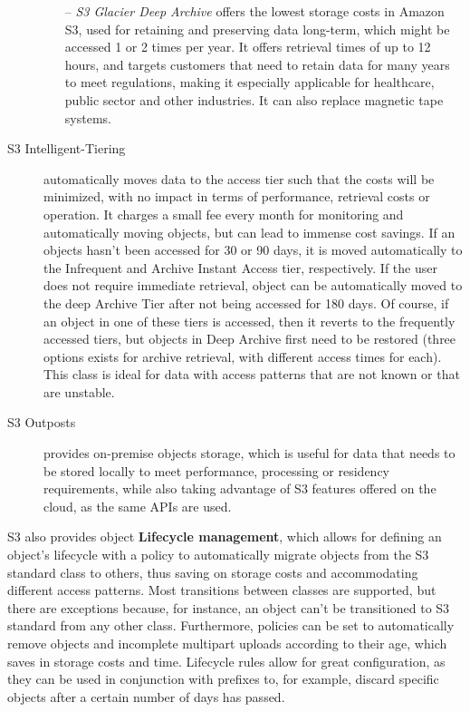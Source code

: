 \begin{description}
\begin{itemize}
        \item[--] \textit{S3 Glacier Deep Archive} offers the lowest storage costs in Amazon S3, used for retaining and preserving data long-term, which might be accessed 1 or 2 times per year. It offers retrieval times of up to 12 hours, and targets customers that need to retain data for many years to meet regulations, making it especially applicable for healthcare, public sector and other industries. It can also replace magnetic tape systems.
    \end{itemize}

    \item[S3 Intelligent-Tiering] automatically moves data to the access tier such that the costs will be minimized, with no impact in terms of performance, retrieval costs or operation. It charges a small fee every month for monitoring and automatically moving objects, but can lead to immense cost savings. If an objects hasn't been accessed for 30 or 90 days, it is moved automatically to the Infrequent and Archive Instant Access tier, respectively. If the user does not require immediate retrieval, object can be automatically moved to the deep Archive Tier after not being accessed for 180 days. Of course, if an object in one of these tiers is accessed, then it reverts to the frequently accessed tiers, but objects in Deep Archive first need to be restored (three options exists for archive retrieval, with different access times for each).~\cite{archiverestore} This class is ideal for data with access patterns that are not known or that are unstable.

    \item[S3 Outposts] provides on-premise objects storage, which is useful for data that needs to be stored locally to meet performance, processing or residency requirements, while also taking advantage of S3 features offered on the cloud, as the same APIs are used.
\end{description}

S3 also provides object\textbf{ Lifecycle management}, which allows for defining an object's lifecycle with a policy to automatically migrate objects from the S3 standard class to others, thus saving on storage costs and accommodating different access patterns. Most transitions between classes are supported, but there are exceptions because, for instance, an object can't be transitioned to S3 standard from any other class. Furthermore,  policies can be set to automatically remove objects and incomplete multipart uploads according to their age, which saves in storage costs and time. Lifecycle rules allow for great configuration, as they can be used in conjunction with prefixes to, for example, discard specific objects after a certain number of days has passed.~\cite{s3lifecycle}

